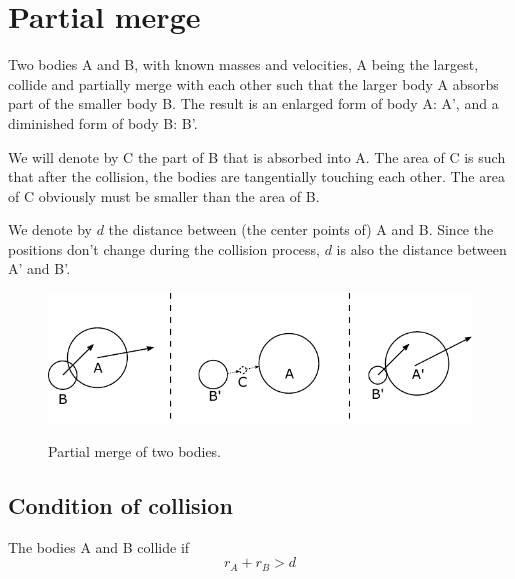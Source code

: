 \documentclass{article}
\begin{document}
\section{Partial merge}
Two bodies A and B, with known masses and velocities, A being the largest, collide and partially merge with each other such that the larger body A absorbs part of the smaller body B. The result is an enlarged form of body A: A', and a diminished form of body B: B'.

We will denote by C the part of B that is absorbed into A. The area of C is such that after the collision, the bodies are tangentially touching each other. The area of C obviously must be smaller than the area of B.

We denote by $d$ the distance between (the center points of) A and B. Since the positions don't change during the collision process, $d$ is also the distance between A' and B'.

\begin{figure}[h]
	\centering
	{\includegraphics{figures/partial_merge.pdf}}
	\caption{Partial merge of two bodies.}\label{fig:partial_merge}
\end{figure}

\subsection{Condition of collision}
The bodies A and B collide if
\begin{equation}
\label{eq:collision_condition_partial_merge}
r_A + r_B > d
\end{equation}
\end{document}
